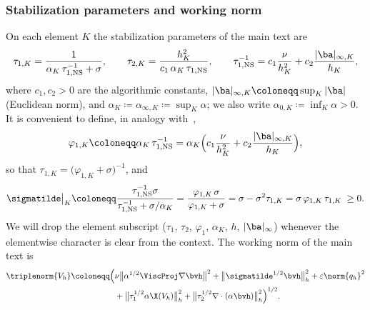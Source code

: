 \subsubsection{Stabilization parameters and working norm}
On each element $K$ the stabilization parameters of the main text are
\begin{equation}\label{eq:taus}
  \tau_{1,K} = \frac{1}{\alpha_K\,\tau_{1,\mathrm{NS}}^{-1} + \sigma},
  \qquad
  \tau_{2,K} = \frac{h_K^2}{c_1\,\alpha_K\,\tau_{1,\mathrm{NS}}},
  \qquad
  \tau_{1,\mathrm{NS}}^{-1}
  = c_1\frac{\nu}{h_K^2} + c_2\frac{|\ba|_{\infty,K}}{h_K},
\end{equation}
where $c_1,c_2>0$ are the algorithmic constants,
$|\ba|_{\infty,K}\coloneqq\sup_K|\ba|$ (Euclidean norm), and
$\alpha_K\coloneqq\alpha_{\infty,K}\coloneqq\sup_K\alpha$; we also write
$\alpha_{0,K}\coloneqq\inf_K\alpha>0$. It is convenient to define, in analogy
with~\cite{codina2001stabilized},
\begin{equation}\label{eq:phi1}
  \varphi_{1,K} \coloneqq \alpha_K\,\tau_{1,\mathrm{NS}}^{-1}
  = \alpha_K\Bigl(c_1\frac{\nu}{h_K^2}+c_2\frac{|\ba|_{\infty,K}}{h_K}\Bigr),
\end{equation}
so that $\tau_{1,K} = \bigl(\varphi_{1,K}+\sigma\bigr)^{-1}$, and
\begin{equation}\label{eq:sigmatilde}
  \sigmatilde\big|_K
  \coloneqq \frac{\tau_{1,\mathrm{NS}}^{-1}\sigma}{\tau_{1,\mathrm{NS}}^{-1}
  + \sigma/\alpha_K}
  = \frac{\varphi_{1,K}\,\sigma}{\varphi_{1,K}+\sigma}
  = \sigma - \sigma^2\tau_{1,K}
  = \sigma\,\varphi_{1,K}\,\tau_{1,K}\;\ge 0 .
\end{equation}
We will drop the element subscript ($\tau_1$, $\tau_2$, $\varphi_1$, $\alpha_K$, $h$,
$|\ba|_\infty$) whenever the elementwise character is clear from the context. The working
norm of the main text is
\begin{equation}\label{eq:triplenorm}
\begin{aligned}
  \triplenorm{V_h}
  \coloneqq \Bigl(
  &\nu\bigl\lVert\alpha^{1/2}\ViscProj\nabla\bvh\bigr\rVert^2
  + \bigl\lVert\sigmatilde^{1/2}\bvh\bigr\rVert_h^2
  + \varepsilon\norm{q_h}^2 \\
  &+ \bigl\lVert\tau_1^{1/2}\alpha\X(V_h)\bigr\rVert_h^2
  + \bigl\lVert\tau_2^{1/2}\nabla\cdot(\alpha\bvh)\bigr\rVert_h^2
  \Bigr)^{1/2}.
\end{aligned}
\end{equation}

